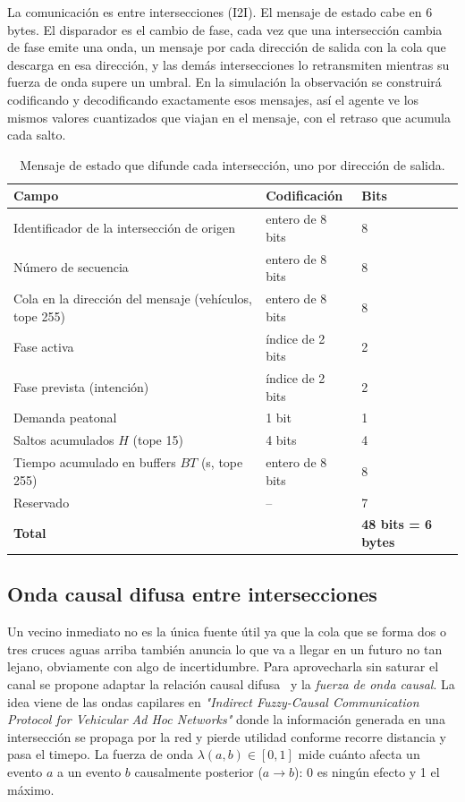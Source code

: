\documentclass[11pt,letterpaper]{article}
\begin{document}
La comunicación es entre intersecciones (I2I). El mensaje de estado cabe en 6 bytes. 
El disparador es el cambio de fase, cada vez que una
intersección cambia de fase emite una onda, un mensaje por cada dirección de
salida con la cola que descarga en esa dirección, y las demás intersecciones lo
retransmiten mientras su fuerza de onda supere un umbral.
En la simulación la observación se
construirá codificando y decodificando exactamente esos mensajes, así el agente ve
los mismos valores cuantizados que viajan en el mensaje, con el retraso que
acumula cada salto.

\begin{table}[!htbp]
\centering\small
\caption{Mensaje de estado que difunde cada intersección, uno por dirección de salida.}
\label{tab:mensaje}
\begin{tabular}{lll}
\toprule
Campo & Codificación & Bits\\
\midrule
Identificador de la intersección de origen & entero de 8 bits & 8\\
Número de secuencia & entero de 8 bits & 8\\
Cola en la dirección del mensaje (vehículos, tope 255) & entero de 8 bits & 8\\
Fase activa & índice de 2 bits & 2\\
Fase prevista (intención) & índice de 2 bits & 2\\
Demanda peatonal & 1 bit & 1\\
Saltos acumulados $H$ (tope 15) & 4 bits & 4\\
Tiempo acumulado en buffers $BT$ (s, tope 255) & entero de 8 bits & 8\\
Reservado & -- & 7\\
\midrule
\textbf{Total} & & \textbf{48 bits = 6 bytes}\\
\bottomrule
\end{tabular}
\end{table}

\subsection{Onda causal difusa entre intersecciones}
\label{sec:onda}

Un vecino inmediato no es la única fuente útil ya que la cola que se forma dos o tres
cruces aguas arriba también anuncia lo que va a llegar en un futuro no tan lejano, obviamente con
algo de incertidumbre. 
Para aprovecharla sin saturar el canal se propone adaptar la relación causal
difusa~\cite{perez2014} y la \emph{fuerza de onda causal}. 
La idea viene de las ondas
capilares en \emph{"Indirect Fuzzy-Causal Communication Protocol for Vehicular 
Ad Hoc Networks"} donde la información generada en una intersección se propaga por la red y
pierde utilidad conforme recorre distancia y pasa el timepo. La fuerza de onda
$\lambda(a,b) \in [0,1]$ mide cuánto afecta un evento $a$ a un evento $b$
causalmente posterior ($a \rightarrow b$): 0 es ningún efecto y 1
el máximo.
\end{document}
